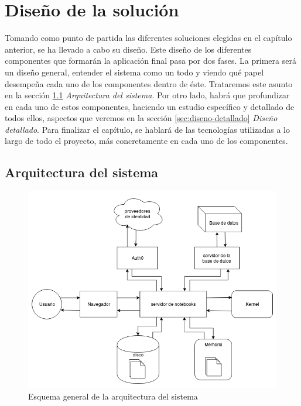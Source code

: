 \documentclass[11pt,spanish,listoffigures]{tfgetsinf}
\begin{document}


\chapter{Diseño de la solución}
\label{ch:diseno-solu}

Tomando como punto de partida las diferentes soluciones elegidas en el capítulo anterior, se ha llevado a cabo su diseño. Este diseño de los diferentes componentes que formarán la aplicación final pasa por dos fases. La primera será un diseño general, entender el sistema como un todo y viendo qué papel desempeña cada uno de los componentes dentro de éste. Trataremos este asunto en la sección \ref{sec:arquitectura-sistema} \textit{Arquitectura del sistema}. Por otro lado, habrá que profundizar en cada uno de estos componentes, haciendo un estudio específico y detallado de todos ellos, aspectos que veremos en la sección \ref{sec:diseno-detallado} \textit{Diseño detallado}. Para finalizar el capítulo, se hablará de las tecnologías utilizadas a lo largo de todo el proyecto, más concretamente en cada uno de los componentes.



\section{Arquitectura del sistema}
\label{sec:arquitectura-sistema}

\begin{figure}[h]
	\centering
  	\includegraphics[width=1\textwidth]{Architecture.png}
  	\caption{Esquema general de la arquitectura del sistema}
  	\label{fig:general-arch}
\end{figure}
\end{document}
